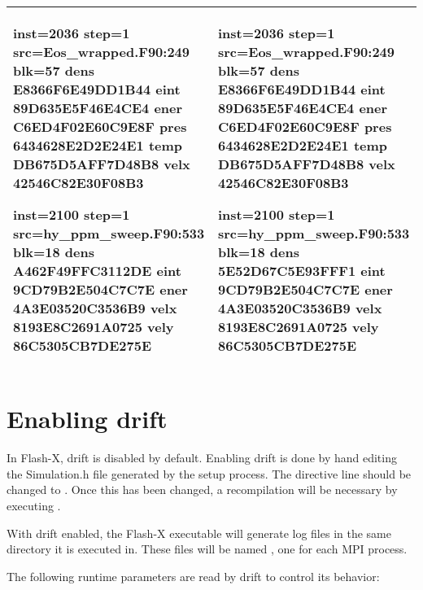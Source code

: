 \begin{tabular}{|p{}|p{}|}
\hline
\begin{scriptsize}
\begin{codeseg}
inst=2036
step=1
src=Eos_wrapped.F90:249
blk=57
 dens E8366F6E49DD1B44
 eint 89D635E5F46E4CE4
 ener C6ED4F02E60C9E8F
 pres 6434628E2D2E24E1
 temp DB675D5AFF7D48B8
 velx 42546C82E30F08B3

inst=2100
step=1
src=hy_ppm_sweep.F90:533
blk=18
 dens A462F49FFC3112DE
 eint 9CD79B2E504C7C7E
 ener 4A3E03520C3536B9
 velx 8193E8C2691A0725
 vely 86C5305CB7DE275E
\end{codeseg}
\end{scriptsize}
&
\begin{scriptsize}
\begin{codeseg}
inst=2036
step=1
src=Eos_wrapped.F90:249
blk=57
 dens E8366F6E49DD1B44
 eint 89D635E5F46E4CE4
 ener C6ED4F02E60C9E8F
 pres 6434628E2D2E24E1
 temp DB675D5AFF7D48B8
 velx 42546C82E30F08B3

inst=2100
step=1
src=hy_ppm_sweep.F90:533
blk=18
 dens 5E52D67C5E93FFF1
 eint 9CD79B2E504C7C7E
 ener 4A3E03520C3536B9
 velx 8193E8C2691A0725
 vely 86C5305CB7DE275E
\end{codeseg}
\end{scriptsize}
\\
\hline
\end{tabular}

\section{Enabling drift}
In Flash-X, drift is disabled by default.  Enabling drift is done by
hand editing the Simulation.h file generated by the setup process.  The directive
line  should be changed to
.  Once this has been changed, a recompilation will be
necessary by executing .

With drift enabled, the Flash-X executable will generate log files in the same
directory it is executed in.  These files will be named ,
one for each MPI process.

The following runtime parameters are read by drift to control its behavior:

